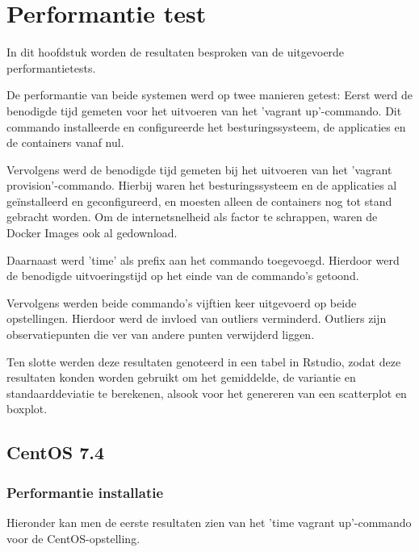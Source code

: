 
\chapter{Performantie test}
\label{ch:performantietest}

In dit hoofdstuk worden de resultaten besproken van de uitgevoerde performantietests.

De performantie van beide systemen werd op twee manieren getest:
Eerst werd de benodigde tijd gemeten voor het uitvoeren van het 'vagrant up'-commando. Dit commando installeerde en configureerde het besturingssysteem, de applicaties en de containers vanaf nul.

Vervolgens werd de benodigde tijd gemeten bij het uitvoeren van het 'vagrant provision'-commando. Hierbij waren het besturingssysteem en de applicaties al geïnstalleerd en geconfigureerd, en moesten alleen de containers nog tot stand gebracht worden. Om de internetsnelheid als factor te schrappen, waren de Docker Images ook al gedownload.

Daarnaast werd 'time' als prefix aan het commando toegevoegd. Hierdoor werd de benodigde uitvoeringstijd op het einde van de commando's getoond.

Vervolgens werden beide commando's vijftien keer uitgevoerd op beide opstellingen. Hierdoor werd de invloed van outliers verminderd. Outliers zijn observatiepunten die ver van andere punten verwijderd liggen.

Ten slotte werden deze resultaten genoteerd in een tabel in Rstudio, zodat deze resultaten konden worden gebruikt om het gemiddelde, de variantie en standaarddeviatie te berekenen, alsook voor het genereren van een scatterplot en boxplot.

\section{CentOS 7.4}

\subsection{Performantie installatie}
Hieronder kan men de eerste resultaten zien van het 'time vagrant up'-commando voor de CentOS-opstelling.

